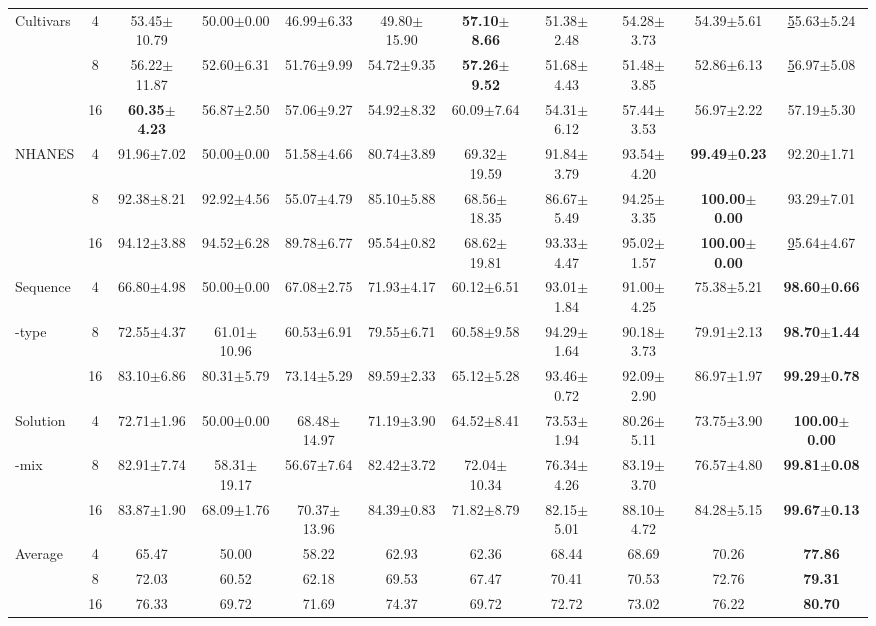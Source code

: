 \begin{table}[t!]
{\begin{tabular}{@{}l|c|cccccccc|c@{}}
Cultivars & 4 & 53.45$\pm$10.79 & 50.00$\pm$0.00 & 46.99$\pm$6.33 & 49.80$\pm$15.90 & \textbf{57.10$\pm$8.66} & 51.38$\pm$2.48 & 54.28$\pm$3.73 & 54.39$\pm$5.61 & {\ul 55.63$\pm$5.24} \\
 & 8 & 56.22$\pm$11.87 & 52.60$\pm$6.31 & 51.76$\pm$9.99 & 54.72$\pm$9.35 & \textbf{57.26$\pm$9.52} & 51.68$\pm$4.43 & 51.48$\pm$3.85 & 52.86$\pm$6.13 & {\ul 56.97$\pm$5.08} \\
 & 16 & \textbf{60.35$\pm$4.23} & 56.87$\pm$2.50 & 57.06$\pm$9.27 & 54.92$\pm$8.32 & 60.09$\pm$7.64 & 54.31$\pm$6.12 & 57.44$\pm$3.53 & 56.97$\pm$2.22 & 57.19$\pm$5.30 \\ \midrule
NHANES & 4 & 91.96$\pm$7.02 & 50.00$\pm$0.00 & 51.58$\pm$4.66 & 80.74$\pm$3.89 & 69.32$\pm$19.59 & 91.84$\pm$3.79 & 93.54$\pm$4.20 & \textbf{99.49$\pm$0.23} & 92.20$\pm$1.71 \\
 & 8 & 92.38$\pm$8.21 & 92.92$\pm$4.56 & 55.07$\pm$4.79 & 85.10$\pm$5.88 & 68.56$\pm$18.35 & 86.67$\pm$5.49 & 94.25$\pm$3.35 & \textbf{100.00$\pm$0.00} & 93.29$\pm$7.01 \\
 & 16 & 94.12$\pm$3.88 & 94.52$\pm$6.28 & 89.78$\pm$6.77 & 95.54$\pm$0.82 & 68.62$\pm$19.81 & 93.33$\pm$4.47 & 95.02$\pm$1.57 & \textbf{100.00$\pm$0.00} & {\ul 95.64$\pm$4.67} \\ \midrule
Sequence & 4 & 66.80$\pm$4.98 & 50.00$\pm$0.00 & 67.08$\pm$2.75 & 71.93$\pm$4.17 & 60.12$\pm$6.51 & 93.01$\pm$1.84 & 91.00$\pm$4.25 & 75.38$\pm$5.21 & \textbf{98.60$\pm$0.66} \\
-type & 8 & 72.55$\pm$4.37 & 61.01$\pm$10.96 & 60.53$\pm$6.91 & 79.55$\pm$6.71 & 60.58$\pm$9.58 & 94.29$\pm$1.64 & 90.18$\pm$3.73 & 79.91$\pm$2.13 & \textbf{98.70$\pm$1.44} \\
 & 16 & 83.10$\pm$6.86 & 80.31$\pm$5.79 & 73.14$\pm$5.29 & 89.59$\pm$2.33 & 65.12$\pm$5.28 & 93.46$\pm$0.72 & 92.09$\pm$2.90 & 86.97$\pm$1.97 & \textbf{99.29$\pm$0.78} \\ \midrule
Solution & 4 & 72.71$\pm$1.96 & 50.00$\pm$0.00 & 68.48$\pm$14.97 & 71.19$\pm$3.90 & 64.52$\pm$8.41 & 73.53$\pm$1.94 & 80.26$\pm$5.11 & 73.75$\pm$3.90 & \textbf{100.00$\pm$0.00} \\
-mix & 8 & 82.91$\pm$7.74 & 58.31$\pm$19.17 & 56.67$\pm$7.64 & 82.42$\pm$3.72 & 72.04$\pm$10.34 & 76.34$\pm$4.26 & 83.19$\pm$3.70 & 76.57$\pm$4.80 & \textbf{99.81$\pm$0.08} \\
 & 16 & 83.87$\pm$1.90 & 68.09$\pm$1.76 & 70.37$\pm$13.96 & 84.39$\pm$0.83 & 71.82$\pm$8.79 & 82.15$\pm$5.01 & 88.10$\pm$4.72 & 84.28$\pm$5.15 & \textbf{99.67$\pm$0.13} \\ \midrule
Average & 4 & 65.47 & 50.00 & 58.22 & 62.93 & 62.36 & 68.44 & 68.69 & 70.26 & \textbf{77.86} \\
 & 8 & 72.03 & 60.52 & 62.18 & 69.53 & 67.47 & 70.41 & 70.53 & 72.76 & \textbf{79.31} \\
 & 16 & 76.33 & 69.72 & 71.69 & 74.37 & 69.72 & 72.72 & 73.02 & 76.22 & \textbf{80.70} \\ \bottomrule
\end{tabular}}
\label{tab:main1}
\end{table}

